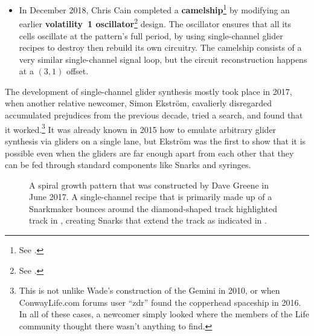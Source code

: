 \begin{itemize}
	\item In December 2018, Chris Cain completed a \textbf{camelship}\footnote{See .} by modifying an earlier \textbf{volatility~1 oscillator}\footnote{See .} design. The oscillator ensures that all its cells oscillate at the pattern's full period, by using single-channel glider recipes to destroy then rebuild its own circuitry. The camelship consists of a very similar single-channel signal loop, but the circuit reconstruction happens at a $(3,1)$ offset.\smallskip
\end{itemize}

The development of single-channel glider synthesis mostly took place in 2017, when another relative newcomer, Simon Ekstr{\"o}m, cavalierly disregarded accumulated prejudices from the previous decade, tried a search, and found that it worked.\footnote{This is not unlike Wade's construction of the Gemini in 2010, or when ConwayLife.com forums user ``zdr'' found the copperhead spaceship in 2016. In all of these cases, a newcomer simply looked where the members of the Life community thought there wasn't anything to find.} It was already known in 2015 how to emulate arbitrary glider synthesis via gliders on a single lane, but Ekstr{\"o}m was the first to show that it is possible even when the gliders are far enough apart from each other that they can be fed through standard components like Snarks and syringes.



\begin{figure}[!htb]
	\centering
	\caption{A spiral growth pattern that was constructed by Dave Greene in June 2017. A single-channel recipe that is primarily made up of a Snarkmaker bounces around the diamond-shaped track highlighted track in , creating Snarks that extend the track as indicated in .}\label{fig:spiral_growth}
\end{figure}

\clearpage %


